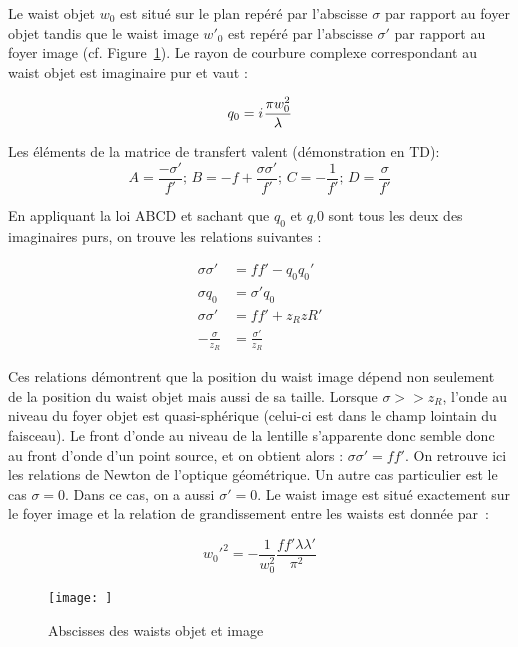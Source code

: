 \documentclass[a4paper]{book}
\newcommand{\iu}{{i\mkern1mu}}
\begin{document}
Le waist objet $w_0$ est situé sur le plan repéré par l'abscisse $\sigma$ par rapport au foyer objet tandis que le waist image $w'_0$ est repéré par l'abscisse $\sigma'$ par rapport au foyer image (cf. Figure~\ref{fig:conjugaison_gauss}). Le rayon de courbure complexe correspondant au waist objet est imaginaire pur et vaut :

\begin{equation}
    q_0=\iu \frac{\pi w_0^2}{\lambda}
\end{equation}

Les éléments de la matrice de transfert valent (démonstration en TD):
\begin{equation}
    A=\frac{-\sigma'}{f'};\,B=-f+\frac{\sigma \sigma'}{f'};\,C=-\frac{1}{f'};\,D=\frac{\sigma}{f'}
\end{equation}

En appliquant la loi ABCD et sachant que $q_0$ et $q_'0$ sont tous les deux des imaginaires purs, on trouve les relations suivantes :

\begin{align}
    \sigma \sigma'&=ff'-q_0q_0'\\
    \sigma q_0 &= \sigma'q_0\\
    \sigma \sigma' &= ff' + z_RzR'\\
    -\frac{\sigma}{z_R}&=\frac{\sigma'}{z_R}
\end{align}

Ces relations démontrent que la position du waist image dépend non seulement de la position du waist objet mais aussi de sa taille. Lorsque $\sigma>>z_R$, l'onde au niveau du foyer objet est quasi-sphérique (celui-ci est dans le champ lointain du faisceau). Le front d'onde au niveau de la lentille s'apparente donc semble donc au front d'onde d'un point source, et on obtient alors : $\sigma\sigma'=ff'$. On retrouve ici les relations de Newton de l'optique géométrique.
Un autre cas particulier est le cas $\sigma=0$. Dans ce cas, on a aussi $\sigma'=0$. Le waist image est situé exactement sur le foyer image et la relation de grandissement entre les waists est donnée par~:

\begin{equation}
    w_0'^2=-\frac{1}{w_0^2}\frac{ff'\lambda\lambda'}{\pi^2}
\end{equation}

\begin{figure}[!htbp]
\begin{center}
\texttt{[image: ]}
\end{center}
\caption{Abscisses des waists objet et image}
\label{fig:conjugaison_gauss}
\end{figure}
\end{document}
